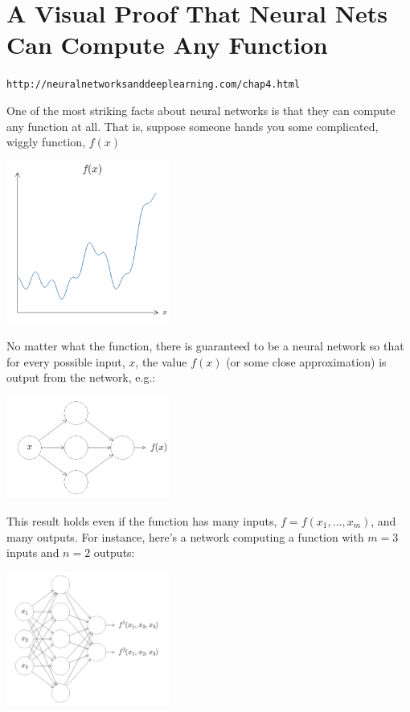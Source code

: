 
\chapter{A Visual Proof That Neural Nets Can Compute Any Function}
\label{sec:AVisualProofThatNeuralNetsCanComputeAnyFunction}

\lstinline{http://neuralnetworksanddeeplearning.com/chap4.html}

One of the most striking facts about neural networks is that they can compute any function at all. That is, suppose someone hands you some complicated, wiggly function, $f(x)$

{\centering \includegraphics[width=0.4\textwidth,]{pic/wigglyfn01.png} \par}

No matter what the function, there is guaranteed to be a neural network so that for every possible input, $x$, the value $f(x)$ (or some close approximation) is output from the network, e.g.:

{\centering \includegraphics[width=0.4\textwidth,]{pic/wigglyfn02.png} \par}

This result holds even if the function has many inputs, $f=f(x_1,\ldots,x_m)$, and many outputs. For instance, here's a network computing a function with $m=3$ inputs and $n=2$
outputs:

{\centering \includegraphics[width=0.4\textwidth,]{pic/wigglyfn03.png} \par}

